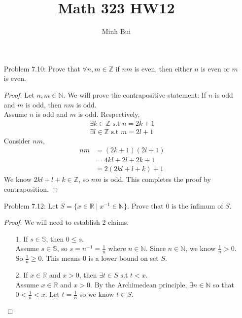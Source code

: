 \documentclass{article}
\author{Minh Bui}
\title{Math 323 HW12}
\theoremstyle{claim}
\theoremstyle{definition}
\begin{document}
\maketitle
\begin{enumerate}
    \item[Problem 7.10: ] Prove that $\forall n, m \in \mathbb{Z}$ if $nm$ is even, then either $n$ is even or $m$ is even.
    \begin{proof}
        Let $n, m \in \mathbb{N}$. We will prove the contrapositive statement: If $n$ is odd and $m$ is odd, then $nm$ is odd.\\
        Assume $n$ is odd and $m$ is odd. Respectively,
        \begin{gather*}
            \exists k \in \mathbb{Z} \text{ s.t } n = 2k + 1\\
            \exists l \in \mathbb{Z} \text{ s.t } m = 2l + 1
        \end{gather*}
        Consider $nm$,
        \begin{align*}
            nm & = (2k + 1)(2l + 1)\\
            & = 4kl + 2l + 2k + 1\\
            & = 2(2kl + l + k) + 1
        \end{align*}
        We know $2kl + l + k \in \mathbb{Z}$, so $nm$ is odd. This completes the proof by contraposition.
    \end{proof}
    \item[Problem 7.12: ] Let $S = \{ x \in \mathbb{R} \mid x^{-1} \in \mathbb{N} \}$. Prove that 0 is the infimum of $S$.
    \begin{proof}
        We will need to establish 2 claims.
        \begin{enumerate}
            \item[1.] If $s \in \mathbb{S}$, then $0 \le s$.\\
                Assume $s \in \mathbb{S}$, so $s = n^{-1} = \frac{1}{n}$ where $n \in \mathbb{N}$. Since $n \in \mathbb{N}$, we know $\frac{1}{n} > 0$. So $\frac{1}{n} \ge 0$. This means $0$ is a lower bound on set $S$.
            \item[2.] If $x \in \mathbb{R}$ and $x > 0$, then $\exists t \in S \text{ s.t } t < x$.\\
                Assume $x \in \mathbb{R}$ and $x > 0$. By the Archimedean principle, $\exists n \in \mathbb{N}$ so that $0 < \frac{1}{n} < x$. Let $t = \frac{1}{n}$ so we know $t \in S$.
        \end{enumerate}

\end{proof}
\end{enumerate}
\end{document}

